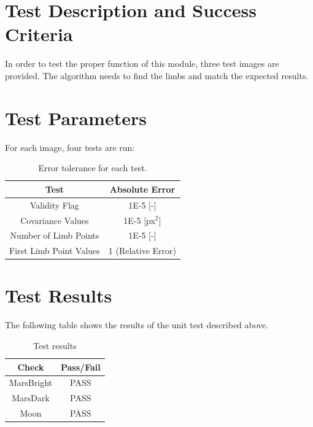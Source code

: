 
\section{Test Description and Success Criteria}
In order to test the proper function of this module, three test images are provided.
The algorithm needs to find the limbs and match the expected results.

\section{Test Parameters}

For each image, four tests are run:

\begin{table}[htbp]
	\caption{Error tolerance for each test.}
	\label{tab:errortol}
	\centering \fontsize{10}{10}\selectfont
	\begin{tabular}{ c | c  } %
		\hline\hline
		\textbf{Test}   & \textbf{Absolute Error}  \\  \hline
		Validity Flag           & 1E-5	 [-]  \\ 
		Covariance Values     & 1E-5	[px$^2$]   \\ 
		Number of Limb Points     & 1E-5	[-]   \\ 
		First Limb Point Values     & 1 (Relative Error)	   \\ 
		\hline\hline
	\end{tabular}
\end{table}


\section{Test Results}
The following table shows the results of the unit test described above.

\begin{table}[H]
	\caption{Test results}
	\label{tab:results}
	\centering \fontsize{10}{10}\selectfont
	\begin{tabular}{c | c  } %
		\hline\hline
		\textbf{Check} 						  		&\textbf{Pass/Fail} \\ 
		\hline
	   MarsBright   			& PASS \\ 
	   MarsDark 			& PASS \\ 
	   Moon   			        & PASS  \\
	   \hline\hline
	\end{tabular}
\end{table}


